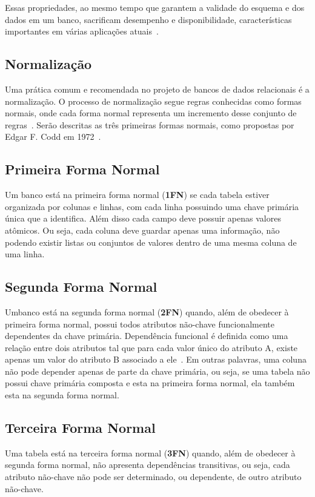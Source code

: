 	Essas propriedades, ao mesmo tempo que garantem a validade do esquema e dos dados em um banco, sacrificam desempenho e disponibilidade, características importantes em várias aplicações atuais~\cite{foxcluster}.

\subsection{Normalização}
	Uma prática comum e recomendada no projeto de bancos de dados relacionais é a normalização. O processo de normalização segue regras conhecidas como formas normais, onde cada forma normal representa um incremento desse conjunto de regras~\cite{jan}. Serão descritas as três primeiras formas normais, como propostas por Edgar F. Codd em 1972~\cite{cjdate}.

\subsection*{Primeira Forma Normal}
	Um banco está na primeira forma normal (\textbf{1FN}) se cada tabela estiver organizada por colunas e linhas, com cada linha possuindo uma chave primária única que a identifica. 
	Além disso cada campo deve possuir apenas valores atômicos. Ou seja, cada coluna deve guardar apenas uma informação, não podendo existir listas ou conjuntos de valores dentro de uma mesma coluna de uma linha.

\subsection*{Segunda Forma Normal}
	Umbanco está na segunda forma normal (\textbf{2FN}) quando, além de obedecer à primeira forma normal, possui todos atributos não-chave funcionalmente dependentes da chave primária. Dependência funcional é definida como uma relação entre dois atributos tal que para cada valor único do atributo A, existe apenas um valor do atributo B associado a ele~\cite{jan}. Em outras palavras, uma coluna não pode depender apenas de parte da chave primária, ou seja, se uma tabela não possui chave primária composta e esta na primeira forma normal, ela também esta na segunda forma normal.
	
\subsection*{Terceira Forma Normal}
	Uma tabela está na terceira forma normal (\textbf{3FN}) quando, além de obedecer à segunda forma normal, não apresenta dependências transitivas, ou seja, cada atributo não-chave não pode ser determinado, ou dependente, de outro atributo não-chave. 

